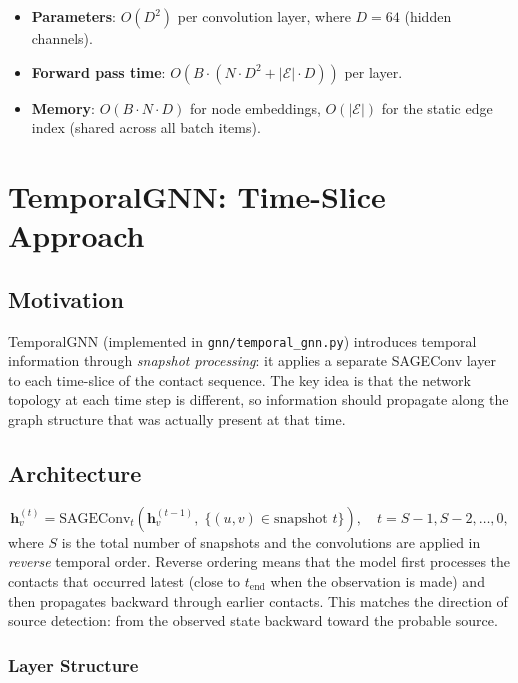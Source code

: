 \documentclass[12pt,a4paper]{report}
\newcommand{\bh}{\mathbf{h}}
\newcommand{\calE}{\mathcal{E}}
\begin{document}
\begin{itemize}[noitemsep]
  \item \textbf{Parameters}: $O(D^2)$ per convolution layer, where $D = 64$ (hidden channels).
  \item \textbf{Forward pass time}: $O(B \cdot (N \cdot D^2 + |\calE| \cdot D))$ per layer.
  \item \textbf{Memory}: $O(B \cdot N \cdot D)$ for node embeddings, $O(|\calE|)$ for
    the static edge index (shared across all batch items).
\end{itemize}

\chapter{TemporalGNN: Time-Slice Approach}
\label{chap:temporal_gnn}

\section{Motivation}

TemporalGNN (implemented in \texttt{gnn/temporal\_gnn.py}) introduces temporal
information through \emph{snapshot processing}: it applies a separate SAGEConv
layer to each time-slice of the contact sequence. The key idea is that the
network topology at each time step is different, so information should propagate
along the graph structure that was actually present at that time.

\section{Architecture}

\begin{equation}
  \bh_v^{(t)} = \text{SAGEConv}_t\!\left(\bh_v^{(t-1)},\; \{(u,v) \in \text{snapshot } t\}\right),
  \quad t = S-1, S-2, \ldots, 0,
\end{equation}
where $S$ is the total number of snapshots and the convolutions are applied in
\emph{reverse} temporal order. Reverse ordering means that the model first
processes the contacts that occurred latest (close to $t_{\text{end}}$ when the
observation is made) and then propagates backward through earlier contacts. This
matches the direction of source detection: from the observed state backward
toward the probable source.

\subsection{Layer Structure}
\end{document}
